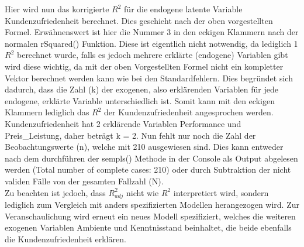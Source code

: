 \documentclass{article}\usepackage[]{graphicx}\usepackage[]{color}
\begin{document}
Hier wird nun das korrigierte $R^{2}$ für die endogene latente Variable Kundenzufriedenheit berechnet. Dies geschieht nach der oben vorgestellten Formel. Erwähnenswert ist hier die Nummer 3 in den eckigen Klammern nach der normalen rSquared() Funktion. Diese ist eigentlich nicht notwendig, da lediglich 1 $R^{2}$ berechnet wurde, falls es jedoch mehrere erklärte (endogene) Variablen gibt wird diese wichtig, da mit der oben Vorgestellten Formel nicht ein kompletter Vektor berechnet werden kann wie bei den Standardfehlern. Dies begründet sich dadurch, dass die Zahl (k) der exogenen, also erklärenden Variablen für jede endogene, erklärte Variable unterschiedlich ist. Somit kann mit den eckigen Klammern lediglich das $R^{2}$ der Kundenzufriedenheit angesprochen werden. Kundenzufriedenheit hat 2 erklärende Variablen Performance und Preis\_Leistung, daher beträgt k = 2. Nun fehlt nur noch die Zahl der Beobachtungswerte (n), welche mit 210 ausgewiesen sind. Dies kann entweder nach dem durchführen der sempls() Methode in der Console als Output abgelesen werden (Total number of complete cases: 210) oder durch Subtraktion der nicht validen Fälle von der gesamten Fallzahl (N).\\
Zu beachten ist jedoch, dass $R^{2}_{adj}$ nicht wie $R^{2}$ interpretiert wird, sondern lediglich zum Vergleich mit anders spezifizierten Modellen herangezogen wird. Zur Veranschaulichung wird erneut ein neues Modell spezifiziert, welches die weiteren exogenen Variablen Ambiente und Kenntnisstand beinhaltet, die beide ebenfalls die Kundenzufriedenheit erklären.
\end{document}
